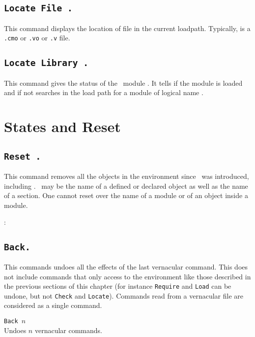 \subsection[\tt Locate File {\str}.]{\tt Locate File {\str}.\label{Locate File}}
This command displays the location of file {\str} in the current loadpath.
Typically, {\str} is a \texttt{.cmo} or \texttt{.vo} or \texttt{.v} file.

\subsection[\tt Locate Library {\dirpath}.]{\tt Locate Library {\dirpath}.}
This command gives the status of the \Coq\ module {\dirpath}. It tells if the
module is loaded and if not searches in the load path for a module
of logical name {\dirpath}.

\section{States and Reset}

\subsection[\tt Reset \ident.]{\tt Reset \ident.}
This command removes all the objects in the environment since \ident\ 
was introduced, including \ident. \ident\ may be the name of a defined
or declared object as well as the name of a section.  One cannot reset
over the name of a module or of an object inside a module.

\begin{ErrMsgs}
\item \ident: 
\end{ErrMsgs}

\subsection[\tt Back.]{\tt Back.}

This commands undoes all the effects of the last vernacular
command. This does not include commands that only access to the
environment like those described in the previous sections of this
chapter (for instance {\tt Require} and {\tt Load} can be undone, but
not {\tt Check} and {\tt Locate}). Commands read from a vernacular
file are considered as a single command.

\begin{Variants}
\item {\tt Back $n$} \\
  Undoes $n$ vernacular commands.
\end{Variants}

